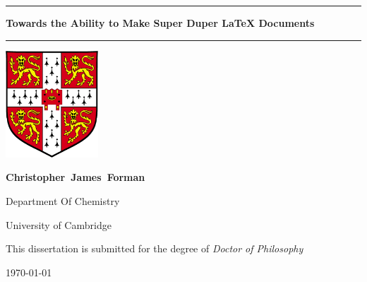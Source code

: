 \thispagestyle{empty}

\begin{center}

\hrule height 2pt
\vspace*{2ex}
{\Huge\textbf{Towards the Ability to Make Super Duper LaTeX Documents}\par}
\vspace*{2ex}
\hrule height 2pt
\vspace*{10ex}
{\includegraphics[height=40mm]{Images/UnivShield}\par}
\vspace*{10ex}
{\large\textbf{Christopher~James~Forman}\par}
\vspace*{2ex}
{\large{Department Of Chemistry}\par}
\vspace*{2ex}
{\large{University of Cambridge}\par}
\vspace*{5ex}
{\large{This dissertation is submitted for the degree of \textit{Doctor of Philosophy}}\par}
\vspace*{5ex}
{\large{\today}\par}

\end{center}